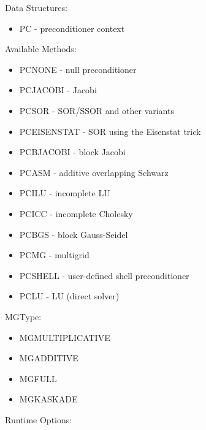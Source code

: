 \noindent
Data Structures:
\begin{itemize}
\item PC - preconditioner context
\end{itemize}
Available Methods: 
\begin{itemize}
\item PCNONE - null preconditioner
\item PCJACOBI - Jacobi
\item PCSOR - SOR/SSOR and other variants
\item PCEISENSTAT - SOR using the Eisenstat trick
\item PCBJACOBI - block Jacobi
\item PCASM - additive overlapping Schwarz
\item PCILU - incomplete LU
\item PCICC - incomplete Cholesky
\item PCBGS - block Gauss-Seidel
\item PCMG - multigrid
\item PCSHELL - user-defined shell preconditioner
\item PCLU - LU (direct solver)
\end{itemize}
MGType:
\begin{itemize}
\item MGMULTIPLICATIVE
\item  MGADDITIVE
\item  MGFULL
\item  MGKASKADE
\end{itemize}
Runtime Options:
